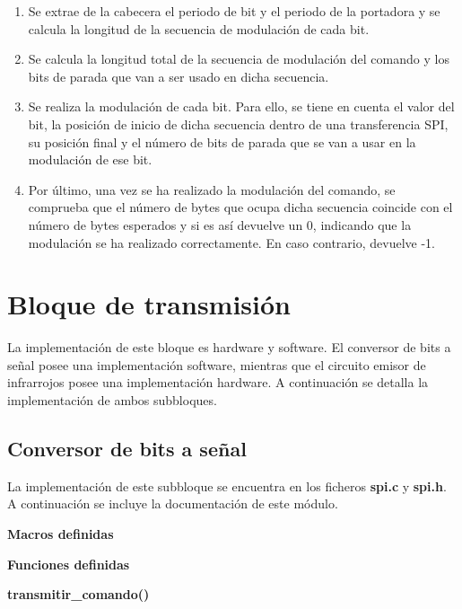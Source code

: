 \begin{enumerate}
\item Se extrae de la cabecera el periodo de bit y el periodo de la portadora y se calcula la longitud de la secuencia de modulación de cada bit. 
\item Se calcula la longitud total de la secuencia de modulación del comando y los bits de parada que van a ser usado en dicha secuencia.
\item Se realiza la modulación de cada bit. Para ello, se tiene en cuenta el valor del bit, la posición de inicio de dicha secuencia dentro de una transferencia SPI, su posición final y el número de bits de parada que se van a usar en la modulación de ese bit.
\item Por último, una vez se ha realizado la modulación del comando, se comprueba que el número de bytes que ocupa dicha secuencia coincide con el número de bytes esperados y si es así devuelve un 0, indicando que la modulación se ha realizado correctamente. En caso contrario, devuelve -1.
\end{enumerate}

\section{Bloque de transmisión}\label{implementacion:transmision}

La implementación de este bloque es hardware y software. El conversor de bits a señal posee una implementación software, mientras que el circuito emisor de infrarrojos posee una implementación hardware. A continuación se detalla la implementación de ambos subbloques.

\subsection{Conversor de bits a señal}\label{sec:conversor}

La implementación de este subbloque se encuentra en los ficheros \textbf{spi.c} y \textbf{spi.h}. A continuación se incluye la documentación de este módulo.

\noindent\Large\textbf{Macros definidas}\label{conversor:macros}



\noindent\Large\textbf{Funciones definidas}\label{conversor:funciones}

\normalsize\textbf{transmitir\_comando()}

